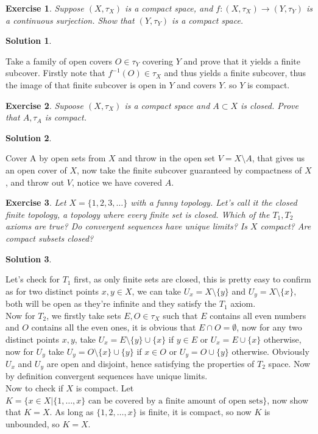 \documentclass[11pt,a4paper]{article}
\newtheorem{Ex}{Exercise}
\newtheorem{Sol}{Solution}
\begin{document}
\begin{Ex}
	Suppose $(X, \tau_X)$ is a compact space, and $f: (X, \tau_X) \rightarrow (Y,\tau_Y)$ is a continuous surjection. Show that $(Y, \tau_Y)$ is a compact space.  
\end{Ex}

\begin{Sol} \end{Sol}
Take a family  of open covers $O \in \tau_Y$ covering $Y$ and prove that it yields a finite subcover. Firstly note that $f^{-1}(O) \in \tau_X$ and thus yields a finite subcover, thus the image of that finite subcover is open in $Y$ and covers $Y$. so $Y$ is compact.

\begin{Ex}
	Supoose $(X , \tau_X)$ is a compact space and $A \subset X$ is closed. Prove that $A, \tau_A$ is compact.
\end{Ex}

\begin{Sol} \end{Sol}
Cover A by open sets from $X$ and throw in the open set $V = X \setminus A$, that gives us an open cover of $X$, now take the finite subcover guaranteed by compactness of $X$, and throw out $V$, notice we have covered $A$.

\begin{Ex}
	Let $X = \{1,2,3, \dots\}$ with a funny topology. Let's call it the closed finite topology, a topology where every finite set is closed. Which of the $T_1, T_2$ axioms are true? Do convergent sequences have unique limits? Is $X$ compact? Are compact subsets closed? 
\end{Ex}
\begin{Sol}\end{Sol}
\noindent Let's check for $T_1$ first, as only finite sets are closed, this is pretty easy to confirm as for two distinct points $x,y \in X$, we can take $U_x = X \setminus \{y\}$ and $U_y = X \setminus \{x\}$, both will be open as they're infinite and they satisfy the $T_1$ axiom. \\
 Now for $T_2$, we firstly take sets $E,O \in \tau_X$ such that $E$ contains all even numbers and $O$ contains all the even ones, it is obvious that $E \cap O = \emptyset$, now for any two distinct points $x, y$, take $U_x = E \setminus \{y\} \cup \{x\}$ if $y \in E$ or $U_x = E \cup \{x\}$ otherwise, now for $U_y$ take $U_y = O \setminus \{x\} \cup \{y\}$ if $x \in O$ or $U_y = O \cup \{y\}$ otherwise. Obviously $U_x$ and $U_y$ are open and disjoint, hence satisfying the properties of $T_2$ space. Now by definition convergent sequences have unique limits. \\
  Now to check if $X$ is compact. Let $K = \{x \in X| \{1, \dots, x \} \text{ can be covered by a finite amount of open sets}\}$, now show that $K = X$. As long as $\{1,2, \dots, x\}$ is finite, it is compact, so now $K$ is unbounded, so $K = X$.
  
\end{document}
